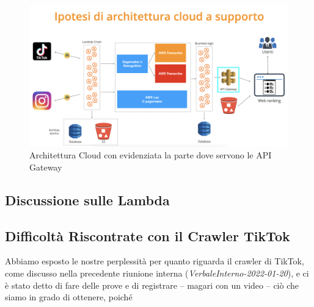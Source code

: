 \begin{figure}[!h]
\centering
\includegraphics[scale=0.35]{Sezioni/images/Architettura.png}
\caption{Architettura Cloud con evidenziata la parte dove servono le API Gateway}
\end{figure}

\subsection{Discussione sulle Lambda}



\subsection{Difficoltà Riscontrate con il Crawler TikTok}

Abbiamo esposto le nostre perplessità per quanto riguarda il crawler di TikTok, come discusso nella precedente riunione interna (\textit{VerbaleInterno-2022-01-20}), e ci è stato detto di fare delle prove e di registrare – magari con un video – ciò che siamo in grado di ottenere, poiché 

\pagebreak